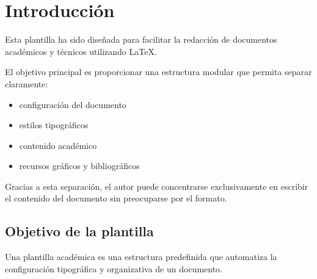 %
%
%
%
%
%
%
%
%
%


\chapter{Introducción}

Esta plantilla ha sido diseñada para facilitar la redacción de
documentos académicos y técnicos utilizando \LaTeX.

El objetivo principal es proporcionar una estructura modular
que permita separar claramente:

\begin{itemize}
\item configuración del documento
\item estilos tipográficos
\item contenido académico
\item recursos gráficos y bibliográficos
\end{itemize}

Gracias a esta separación, el autor puede concentrarse
exclusivamente en escribir el contenido del documento
sin preocuparse por el formato.




\section{Objetivo de la plantilla}

\begin{definitionbox}
Una plantilla académica es una estructura predefinida
que automatiza la configuración tipográfica y
organizativa de un documento.
\end{definitionbox}

